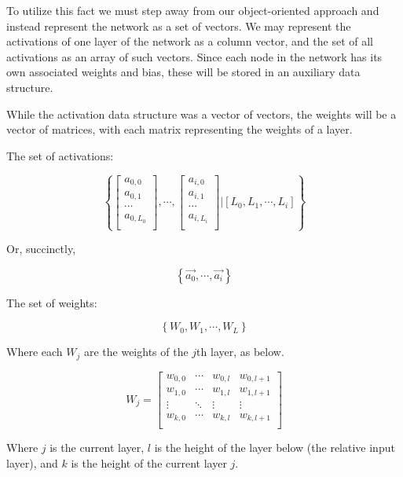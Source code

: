\documentclass[8pt]{amsart}
\begin{document}
To utilize this fact we must step away from our object-oriented approach and
instead represent the network as a set of vectors. We may represent the activations
of one layer of the network as a column vector, and the set of all activations as
an array of such vectors. Since each node in the network has its own associated
weights and bias, these will be stored in an auxiliary data structure.

While the activation data structure was a vector of vectors, the weights will be
a vector of matrices, with each matrix representing the weights of a layer.

The set of activations:

\[
\left\{
    \begin{bmatrix}
        a_{0, 0} \\
        a_{0, 1} \\
        \cdots{} \\
        a_{0, L_0} \\
    \end{bmatrix},
    \cdots{},
    \begin{bmatrix}
        a_{i, 0} \\
        a_{i, 1} \\
        \cdots{} \\
        a_{i, L_i} \\
    \end{bmatrix} \vert
    \left[ L_0, L_1, \cdots{}, L_i \right]
\right\}
\]

Or, succinctly,

\[
\left\{
    \vec{a_0},
    \cdots,
    \vec{a_i}
\right\}
\]

The set of weights:

\[
\left\{
    W_0, W_1, \cdots, W_L
\right\}
\]

Where each $W_j$ are the weights of the $j$th layer, as below.

\[
    W_j =
    \begin{bmatrix}
        w_{0, 0} & \cdots & w_{0, l} & w_{0, l + 1} \\
        w_{1, 0} & \cdots & w_{1, l} & w_{1, l + 1} \\
        \vdots   & \ddots & \vdots   & \vdots       \\
        w_{k, 0} & \cdots & w_{k, l} & w_{k, l + 1} \\
    \end{bmatrix}
\]

Where $j$ is the current layer, $l$ is the height of the layer below (the relative
input layer), and $k$ is the height of the current layer $j$.
\end{document}
